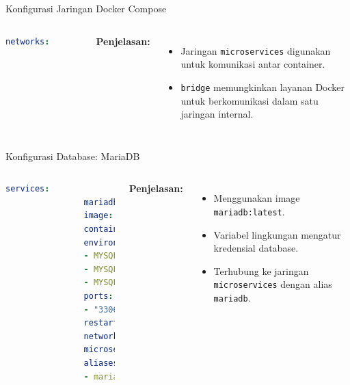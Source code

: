 \documentclass[aspectratio=169, table]{beamer}
\begin{document}
\begin{frame}[fragile]{Konfigurasi Jaringan Docker Compose}
	\vspace{20pt}
	\begin{columns}
		\begin{lstlisting}[language=yaml]
			networks:
				microservices:
				name: microservices
				driver: bridge
		\end{lstlisting}
		
		\textbf{Penjelasan:}
		\begin{itemize}
			\item Jaringan \texttt{microservices} digunakan untuk komunikasi antar container.
			\item \texttt{bridge} memungkinkan layanan Docker untuk berkomunikasi dalam satu jaringan internal.
		\end{itemize}
	\end{columns}
\end{frame}

\begin{frame}[fragile]{Konfigurasi Database: MariaDB}
	\vspace{20pt}
	\begin{columns}
		\column{0.55\textwidth}
		\begin{lstlisting}[language=yaml]
			services:
				mariadb:
				image: mariadb:latest
				container_name: mariadb
				environment:
				- MYSQL_ROOT_PASSWORD=1234
				- MYSQL_USER=alfa
				- MYSQL_PASSWORD=1234
				ports:
				- "3306:3306"
				restart: always
				networks:
				microservices:
				aliases:
				- mariadb
		\end{lstlisting}
		
		\column{0.45\textwidth}
		\textbf{Penjelasan:}
		\begin{itemize}
			\item Menggunakan image \texttt{mariadb:latest}.
			\item Variabel lingkungan mengatur kredensial database.
			\item Terhubung ke jaringan \texttt{microservices} dengan alias \texttt{mariadb}.
		\end{itemize}
	\end{columns}
\end{frame}
\end{document}
